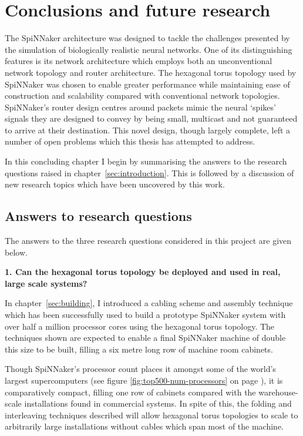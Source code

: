 \chapter{Conclusions and future research}
	
	The SpiNNaker architecture was designed to tackle the challenges presented by
	the simulation of biologically realistic neural networks. One of its
	distinguishing features is its network architecture which employs both an
	unconventional network topology and router architecture. The hexagonal torus
	topology used by SpiNNaker was chosen to enable greater performance while
	maintaining ease of construction and scalability compared with conventional
	network topologies. SpiNNaker's router design centres around packets mimic
	the neural `spikes' signals they are designed to convey by being small,
	multicast and not guaranteed to arrive at their destination. This novel
	design, though largely complete, left a number of open problems which this
	thesis has attempted to address.
	
	In this concluding chapter I begin by summarising the answers to the research
	questions raised in chapter~\ref{sec:introduction}. This is followed by a
	discussion of new research topics which have been uncovered by this work.
	
	\section{Answers to research questions}
		
		The answers to the three research questions considered in this project are
		given below.
		
		\textbf{1. Can the hexagonal torus topology be deployed and used in real,
		large scale systems?}
		
		In chapter~\ref{sec:building}, I introduced a cabling scheme and assembly
		technique which has been successfully used to build a prototype SpiNNaker
		system with over half a million processor cores using the hexagonal torus
		topology. The techniques shown are expected to enable a final SpiNNaker
		machine of double this size to be built, filling a six metre long row of
		machine room cabinets.
		
		Though SpiNNaker's processor count places it amongst some of the world's
		largest supercomputers (see figure \ref{fig:top500-num-processors} on page
		\pageref{fig:top500-num-processors}), it is comparatively compact, filling
		one row of cabinets compared with the warehouse-scale installations found
		in commercial systems. In spite of this, the folding and interleaving
		techniques described will allow hexagonal torus topologies to scale to
		arbitrarily large installations without cables which span most of the
		machine.
		
